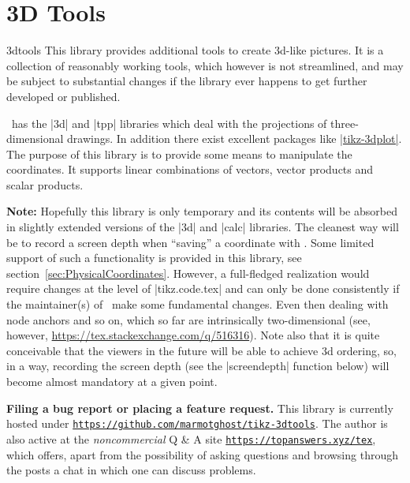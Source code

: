 \documentclass[a4paper,fleqn]{ltxdoc}
\begin{document}
\section{3D Tools}
\begin{tikzlibrary}{3dtools}
	This library provides additional tools to create 3d-like pictures. It is a
	collection of reasonably working tools, which however is not streamlined,
	and may be subject to substantial changes if the library ever happens to get
	further developed or published.
\end{tikzlibrary}

\tikzname\ has the |3d| and |tpp| libraries which deal with the projections of
three-dimensional drawings. In addition there exist excellent packages like
\href{https://ctan.org/pkg/tikz-3dplot?lang=en}{|tikz-3dplot|}. The purpose of
this library is to provide some means to manipulate the coordinates. It supports
linear combinations of vectors, vector products and scalar products. 

\noindent\textbf{Note:} Hopefully this library is only temporary and its
contents will be absorbed in slightly extended versions of the |3d| and |calc|
libraries. The cleanest way will be to record a screen depth when ``saving'' a
coordinate with \tikzname. Some limited support of such a functionality is
provided in this library, see section~\ref{sec:PhysicalCoordinates}. However, a
full-fledged realization would require changes at the level of |tikz.code.tex|
and can only be done consistently if the maintainer(s) of \tikzname\ make some
fundamental changes. Even then dealing with node anchors and so on, which so far
are intrinsically two-dimensional (see, however,
\href{https://tex.stackexchange.com/q/516316}{https://tex.stackexchange.com/q/516316}).
Note also that it is quite conceivable that the viewers in the future will be
able to achieve 3d ordering, so, in a way, recording the screen depth (see the
|screendepth| function below) will become almost mandatory at a given point. 

\noindent\textbf{Filing a bug report or placing a feature request.} This library
is currently hosted under
\href{https://github.com/marmotghost/tikz-3dtools}{\texttt{https://github.com/marmotghost/tikz-3dtools}}.
The author is also active at the \emph{noncommercial} Q \& A site
\href{https://topanswers.xyz/tex}{\texttt{https://topanswers.xyz/tex}}, which offers, apart from the possibility of
asking questions and browsing through the posts a chat in which one can discuss
problems. 
\end{document}

